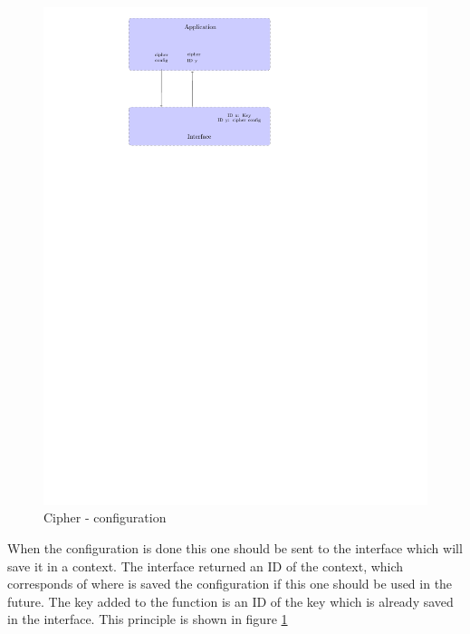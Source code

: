 \begin{figure}[!ht]
\centering
\includegraphics[trim=8.5cm 20cm 9.5cm 0cm]{figures/cipher_example_config.pdf}
\caption{Cipher - configuration\newline}
\label{fig:gci_cipher_config}
\end{figure}

When the configuration is done this one should be sent to the interface
which will save it in a context.
The interface returned an ID of the context, which corresponds of where is saved
the configuration if this one should be used in the future.
The key added to the function is an ID of the key which is already saved in
the interface.
This principle is shown in figure \ref{fig:gci_cipher_config}


